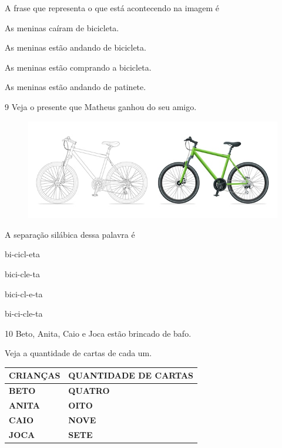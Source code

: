 
A frase que representa o que está acontecendo na imagem é

\begin{escolha}
\item As meninas caíram de bicicleta.

\item As meninas estão andando de bicicleta.

\item As meninas estão comprando a bicicleta.

\item As meninas estão andando de patinete.
\end{escolha}


\num{9} Veja o presente que Matheus ganhou do seu amigo.

\begin{figure}[htpb!]
\centering
\includegraphics[width=.5\textwidth]{media/image180.jpeg}
\end{figure}


A separação silábica dessa palavra é

\begin{escolha}
\item bi-cicl-eta

\item bici-cle-ta

\item bici-cl-e-ta

\item bi-ci-cle-ta
\end{escolha}

\num{10} Beto, Anita, Caio e Joca estão brincado de bafo.

Veja a quantidade de cartas de cada um.

\begin{longtable}[]{@{}ll@{}}
\toprule
\textbf{CRIANÇAS} & \textbf{QUANTIDADE DE CARTAS}\tabularnewline
\midrule
\endhead
\textbf{BETO} & \textbf{QUATRO}\tabularnewline
\textbf{ANITA} & \textbf{OITO}\tabularnewline
\textbf{CAIO} & \textbf{NOVE}\tabularnewline
\textbf{JOCA} & \textbf{SETE}\tabularnewline
\bottomrule
\end{longtable}


